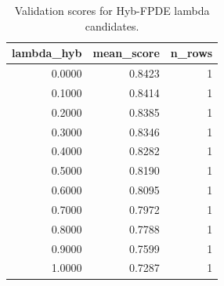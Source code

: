 \begin{table}[t]
\caption{Validation scores for Hyb-FPDE lambda candidates.}
\label{tab:lambda_distribution_computed}
\centering
\begin{tabular}{rrr}
\toprule
lambda\_hyb & mean\_score & n\_rows \\
\midrule
0.0000 & 0.8423 & 1 \\
0.1000 & 0.8414 & 1 \\
0.2000 & 0.8385 & 1 \\
0.3000 & 0.8346 & 1 \\
0.4000 & 0.8282 & 1 \\
0.5000 & 0.8190 & 1 \\
0.6000 & 0.8095 & 1 \\
0.7000 & 0.7972 & 1 \\
0.8000 & 0.7788 & 1 \\
0.9000 & 0.7599 & 1 \\
1.0000 & 0.7287 & 1 \\
\bottomrule
\end{tabular}

\end{table}
